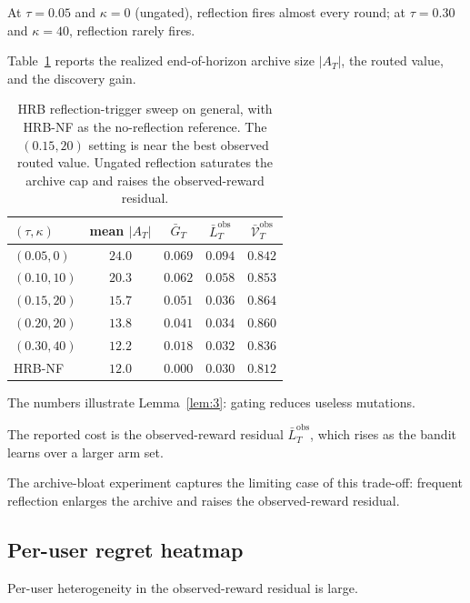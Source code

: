 \documentclass{article} %
\begin{document}
At $\tau=0.05$ and $\kappa=0$ (ungated), reflection fires almost every round; at $\tau=0.30$ and $\kappa=40$, reflection rarely fires.

Table~\ref{tab:app-reflection-sweep} reports the realized end-of-horizon archive size $|A_T|$, the routed value, and the discovery gain.

\begin{table}[h]
\centering
\small
\caption{HRB reflection-trigger sweep on general, with HRB-NF as the
no-reflection reference. The \((0.15,20)\) setting is
near the best observed routed value. Ungated reflection saturates the archive
cap and raises the observed-reward residual.}
\label{tab:app-reflection-sweep}
\begin{tabular}{lcccc}
\toprule
$(\tau,\kappa)$ & mean $|A_T|$ & $\bar G_T$ & $\bar L_T^{\mathrm{obs}}$ & $\bar{\mathcal V}_T^{\mathrm{obs}}$ \\
\midrule
$(0.05,0)$    & $24.0$ & $0.069$ & $0.094$ & $0.842$ \\
$(0.10,10)$   & $20.3$ & $0.062$ & $0.058$ & $0.853$ \\
$(0.15,20)$   & $15.7$ & $0.051$ & $0.036$ & $0.864$ \\
$(0.20,20)$   & $13.8$ & $0.041$ & $0.034$ & $0.860$ \\
$(0.30,40)$   & $12.2$ & $0.018$ & $0.032$ & $0.836$ \\
HRB-NF       & $12.0$ & $0.000$ & $0.030$ & $0.812$ \\
\bottomrule
\end{tabular}

\end{table}

The numbers illustrate Lemma~\ref{lem:3}: gating reduces useless mutations.

The reported cost is the observed-reward residual
\(\bar L_T^{\mathrm{obs}}\), which rises as the bandit learns over a larger arm
set.

The archive-bloat experiment captures the limiting case of this trade-off: frequent reflection enlarges the archive and raises the observed-reward residual.

\subsection{Per-user regret heatmap}

\label{app:per-user-regret}

Per-user heterogeneity in the observed-reward residual is large.
\end{document}
